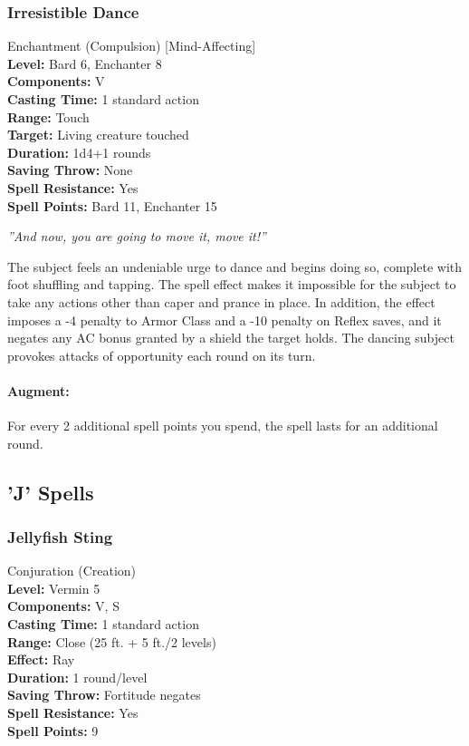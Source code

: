 \subsubsection{Irresistible Dance}
\label{Spell:IrresistibleDance}
Enchantment (Compulsion) [Mind-Affecting]
\\ \textbf{Level:} Bard 6, Enchanter 8
\\ \textbf{Components:} V
\\ \textbf{Casting Time:} 1 standard action
\\ \textbf{Range:} Touch
\\ \textbf{Target:} Living creature touched
\\ \textbf{Duration:} 1d4+1 rounds
\\ \textbf{Saving Throw:} None
\\ \textbf{Spell Resistance:} Yes
\\ \textbf{Spell Points:} Bard 11, Enchanter 15

\emph{''And now, you are going to move it, move it!''}

The subject feels an undeniable urge to dance and begins doing so, complete with foot shuffling and tapping. 
The spell effect makes it impossible for the subject to take any actions other than caper and prance in place. 
In addition, the effect imposes a -4 penalty to Armor Class and a -10 penalty on Reflex saves, and it negates any AC bonus granted by a shield the target holds. 
The dancing subject provokes attacks of opportunity each round on its turn.

\paragraph{Augment:} For every 2 additional spell points you spend, the spell lasts for an additional round.
\subsection{'J' Spells}
\subsubsection{Jellyfish Sting}
\label{Spell:JellyfishSting}
Conjuration (Creation)
\\ \textbf{Level:} Vermin 5
\\ \textbf{Components:} V, S
\\ \textbf{Casting Time:} 1 standard action
\\ \textbf{Range:} Close (25 ft. + 5 ft./2 levels)
\\ \textbf{Effect:} Ray
\\ \textbf{Duration:} 1 round/level
\\ \textbf{Saving Throw:} Fortitude negates
\\ \textbf{Spell Resistance:} Yes
\\ \textbf{Spell Points:} 9

